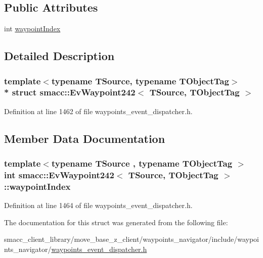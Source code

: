 \subsection*{Public Attributes}
\begin{DoxyCompactItemize}
\item 
int \hyperlink{structsmacc_1_1EvWaypoint242_acba752adfd8875f9ad88ac1c4749e4ad}{waypoint\+Index}
\end{DoxyCompactItemize}


\subsection{Detailed Description}
\subsubsection*{template$<$typename T\+Source, typename T\+Object\+Tag$>$\\*
struct smacc\+::\+Ev\+Waypoint242$<$ T\+Source, T\+Object\+Tag $>$}



Definition at line 1462 of file waypoints\+\_\+event\+\_\+dispatcher.\+h.



\subsection{Member Data Documentation}
\subsubsection[{\texorpdfstring{waypoint\+Index}{waypointIndex}}]{\setlength{\rightskip}{0pt plus 5cm}template$<$typename T\+Source , typename T\+Object\+Tag $>$ int {\bf smacc\+::\+Ev\+Waypoint242}$<$ T\+Source, T\+Object\+Tag $>$\+::waypoint\+Index}\hypertarget{structsmacc_1_1EvWaypoint242_acba752adfd8875f9ad88ac1c4749e4ad}{}\label{structsmacc_1_1EvWaypoint242_acba752adfd8875f9ad88ac1c4749e4ad}


Definition at line 1464 of file waypoints\+\_\+event\+\_\+dispatcher.\+h.



The documentation for this struct was generated from the following file\+:\begin{DoxyCompactItemize}
\item 
smacc\+\_\+client\+\_\+library/move\+\_\+base\+\_\+z\+\_\+client/waypoints\+\_\+navigator/include/waypoints\+\_\+navigator/\hyperlink{waypoints__event__dispatcher_8h}{waypoints\+\_\+event\+\_\+dispatcher.\+h}\end{DoxyCompactItemize}
